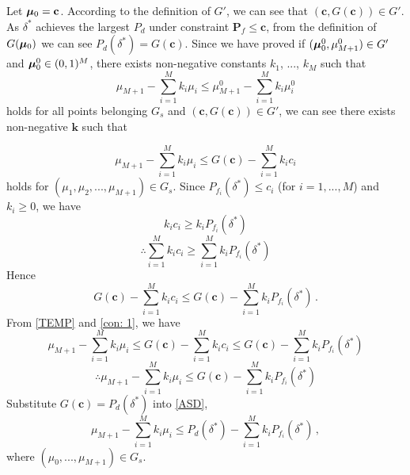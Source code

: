 Let $\boldsymbol{\mu}_0 = \mathbf{c}$. According to the definition of $G'$, we can see that $(\mathbf{c},G(\mathbf{c})) \in G'$.  As $\delta^\ast $ achieves the largest $P_d$ under constraint $\mathbf{P}_f \leq \mathbf{c}$, from the definition of $G(\boldsymbol{\mu}_0)$ we can see $P_{d}(\delta^\ast) = G(\mathbf{c})$. 
Since we have proved if $(\boldsymbol{\mu}_0^0, \mu_{M+1}^0) \in G'$ and $\boldsymbol{\mu}_0^0 \in (0, 1)^M$, there exists non-negative constants $k_1$, ..., $k_M$ such that
\begin{equation}
\mu_{M+1} - \sum_{i=1}^{M}k_i\mu_i \leq \mu_{M+1}^0 - \sum_{i=1}^{M}k_i\mu_i^0
\label{PPI32015}
\end{equation}
holds for all points belonging $G_s$ and $(\mathbf{c},G(\mathbf{c})) \in G'$, we can see there exists non-negative $\mathbf{k}$ such that  

\begin{equation}
\label{TEMP}
\mu_{M+1} - \sum_{i=1}^{M}k_i\mu_i \leq G(\mathbf{c}) - \sum_{i=1}^{M}k_ic_i
\end{equation}
holds for $(\mu_1, \mu_2, ..., \mu_{M+1}) \in G_s$.
Since $P_{f_i}(\delta^\ast) \leq c_i$ (for $i=1, ..., M$) and $k_i \geq 0$, we have  
\[
k_ic_i \geq k_iP_{f_i}(\delta^\ast)
\]
\[
\therefore \sum_{i=1}^{M}k_ic_i \geq \sum_{i=1}^{M}k_iP_{f_i}(\delta^\ast)
\]
Hence 
\begin{equation}
\label{con: 1}
G(\mathbf{c}) - \sum_{i=1}^{M}k_ic_i \leq G(\mathbf{c}) - \sum_{i=1}^{M}k_iP_{f_i}(\delta^\ast)\,.
\end{equation}
From \eqref{TEMP} and \eqref{con: 1}, we have 
\begin{equation}
\label{equ: TEMP3}
\mu_{M+1} - \sum_{i=1}^{M}k_i\mu_i \leq G(\mathbf{c}) - \sum_{i=1}^{M}k_ic_i \leq G(\mathbf{c}) - \sum_{i=1}^{M}k_iP_{f_i}(\delta^\ast)
\end{equation}
\begin{equation}
\label{ASD}
\therefore \mu_{M+1} - \sum_{i=1}^{M}k_i\mu_i \leq G(\mathbf{c}) - \sum_{i=1}^{M}k_iP_{f_i}(\delta^\ast)
\end{equation}
Substitute $G(\mathbf{c}) = P_d(\delta^\ast)$ into \eqref{ASD}, 
\begin{equation}
\label{TEMP2}
\mu_{M+1} - \sum_{i=1}^{M}k_i\mu_i \leq P_d(\delta^\ast) - \sum_{i=1}^{M}k_iP_{f_i}(\delta^\ast)\,,
\end{equation}
where $(\mu_0, ..., \mu_{M+1}) \in G_s$.

